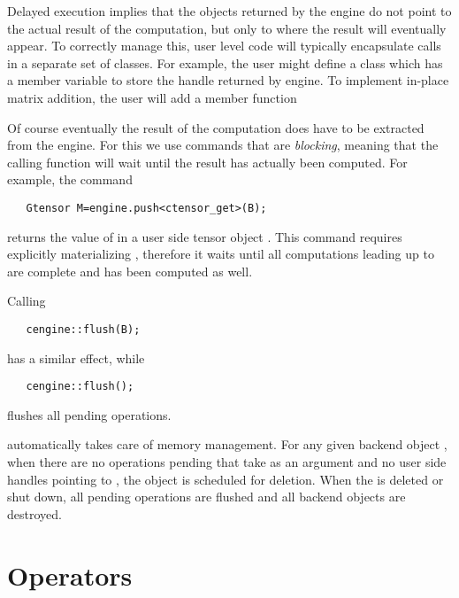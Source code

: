 Delayed execution implies that the  objects returned by the engine do not 
point to the actual result of the computation, but only to where the result will eventually appear. 
To correctly manage this, user level code will typically encapsulate  calls in 
a separate set of classes. For example, the user might define a  class which has 
a member variable  to store the handle returned by engine. 
To implement in-place matrix addition, the user will add a member function 


Of course eventually the result of the computation does have to be extracted from the engine. %
For this we use commands that are \emph{blocking}, meaning that the calling function will  
wait until the result has actually been computed. For example, the command 

\texttt{~~~Gtensor M=engine.push<ctensor\_get>(B);}

returns the value of  in a user side tensor object . This command requires 
explicitly materializing , therefore it waits until all computations leading up to  
are complete and  has been computed as well. 

Calling 

\texttt{~~~cengine::flush(B);}

has a similar effect, while 

\texttt{~~~cengine::flush();}

flushes all pending operations.  

\Cengine{} automatically takes care of memory management. 
For any given backend object , when there are no operations pending that take  
as an argument and no user side handles pointing to , 
the object is scheduled for deletion. 
When the  is deleted or shut down, all pending 
operations are flushed and all backend objects are destroyed. 

\section*{Operators}

